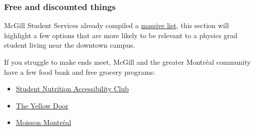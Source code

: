 \subsubsection{Free and discounted things} \label{discounts} 

McGill Student Services already compiled a \href{https://www.mcgill.ca/studentaid/files/studentaid/cheap_sheet_2025_final_updated_1125.pdf}{massive list}, this section will highlight a few options that are more likely to be relevant to a physics grad student living near the downtown campus.

If you struggle to make ends meet, McGill and the greater Montr\'eal community have a few food bank and free grocery programs: 
        \begin{itemize}
            \item \href{https://snacmcgill.wixsite.com/snac}{Student Nutrition Accessibility Club }
            \item \href{https://yellowdoor.org/connections-over-food/}{The Yellow Door}
            \item \href{https://www.moissonmontreal.org/en/}{Moisson Montréal}
        \end{itemize}

